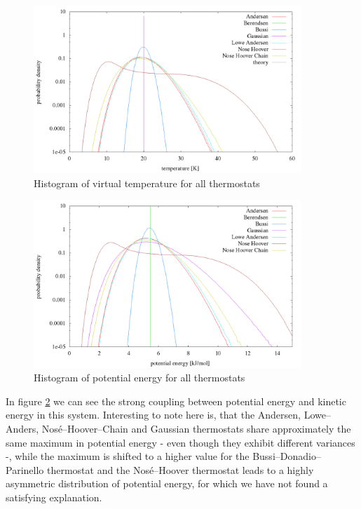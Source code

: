 \begin{figure}[H]
\centering
\includegraphics[width=0.9\textwidth]{./graphics/Histogramm_tempCol_rand_T=20_p=64.png}
\caption{Histogram of virtual temperature for all thermostats}
\label{im:temp_rand}
\end{figure}

\begin{figure}[H]
\centering
\includegraphics[width=0.9\textwidth]{./graphics/Histogramm_epot_rand_T=20_p=64.png}
\caption{Histogram of potential energy for all thermostats}
\label{im:epot_rand}
\end{figure}
In figure \ref{im:epot_rand} we can see the strong coupling between potential energy and kinetic energy in this system. Interesting to note here is, that the Andersen, Lowe--Anders, Nosé--Hoover--Chain and Gaussian thermostats share approximately the same maximum in potential energy - even though they exhibit different variances -, while the maximum is shifted to a higher value for the Bussi--Donadio--Parinello thermostat and the Nosé--Hoover thermostat leads to a highly asymmetric distribution of potential energy, for which we have not found a satisfying explanation.    

